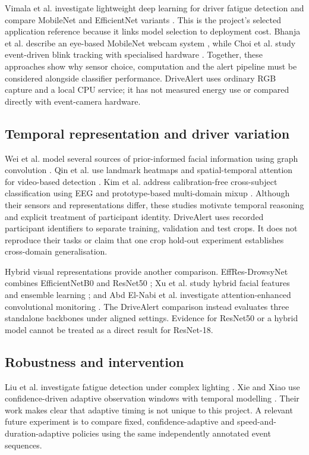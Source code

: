\documentclass[pdflatex,sn-mathphys-num]{sn-jnl}
\begin{document}
Vimala et al. investigate lightweight deep learning for driver fatigue detection and compare MobileNet and EfficientNet variants \cite{vimala2026lightweight}. This is the project's selected application reference because it links model selection to deployment cost. Bhanja et al. describe an eye-based MobileNet webcam system \cite{bhanja2025ddsh}, while Choi et al. study event-driven blink tracking with specialised hardware \cite{choi2025ebts}. Together, these approaches show why sensor choice, computation and the alert pipeline must be considered alongside classifier performance. DriveAlert uses ordinary RGB capture and a local CPU service; it has not measured energy use or compared directly with event-camera hardware.

\subsection{Temporal representation and driver variation}
Wei et al. model several sources of prior-informed facial information using graph convolution \cite{wei2025migcn}. Qin et al. use landmark heatmaps and spatial-temporal attention for video-based detection \cite{qin2025heatmaps}. Kim et al. address calibration-free cross-subject classification using EEG and prototype-based multi-domain mixup \cite{kim2025calibration}. Although their sensors and representations differ, these studies motivate temporal reasoning and explicit treatment of participant identity. DriveAlert uses recorded participant identifiers to separate training, validation and test crops. It does not reproduce their tasks or claim that one crop hold-out experiment establishes cross-domain generalisation.

Hybrid visual representations provide another comparison. EffRes-DrowsyNet combines EfficientNetB0 and ResNet50 \cite{algburi2025effres}; Xu et al. study hybrid facial features and ensemble learning \cite{xu2025hybrid}; and Abd El-Nabi et al. investigate attention-enhanced convolutional monitoring \cite{elnabi2026attention}. The DriveAlert comparison instead evaluates three standalone backbones under aligned settings. Evidence for ResNet50 or a hybrid model cannot be treated as a direct result for ResNet-18.

\subsection{Robustness and intervention}
Liu et al. investigate fatigue detection under complex lighting \cite{liu2025yolofdcl}. Xie and Xiao use confidence-driven adaptive observation windows with temporal modelling \cite{xie2026adaptive}. Their work makes clear that adaptive timing is not unique to this project. A relevant future experiment is to compare fixed, confidence-adaptive and speed-and-duration-adaptive policies using the same independently annotated event sequences.
\end{document}
